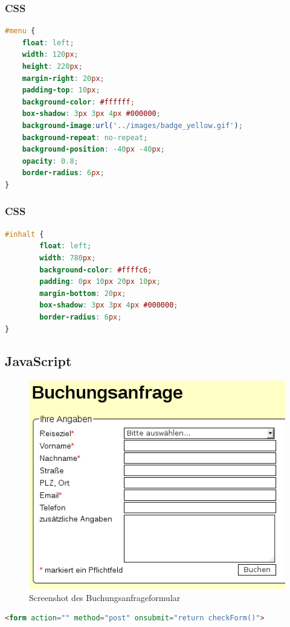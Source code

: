 \documentclass[xcolor=dvipsnames]{beamer}
\begin{document}
\begin{frame}[fragile]
\frametitle{CSS}

\begin{lstlisting}[language=CSS, firstnumber=12]
#menu {
    float: left;
    width: 120px;
    height: 220px;
    margin-right: 20px;
    padding-top: 10px;
    background-color: #ffffff;
    box-shadow: 3px 3px 4px #000000;
    background-image:url('../images/badge_yellow.gif');
    background-repeat: no-repeat;
    background-position: -40px -40px;
    opacity: 0.8;
    border-radius: 6px;
}
\end{lstlisting}
\end{frame}

\begin{frame}[fragile]
\frametitle{CSS}

\begin{lstlisting}[language=CSS, firstnumber=51]
#inhalt {
        float: left;
        width: 780px;
        background-color: #ffffc6;
        padding: 0px 10px 20px 10px;
        margin-bottom: 20px;
        box-shadow: 3px 3px 4px #000000;
        border-radius: 6px;
}

\end{lstlisting}
\end{frame}


\subsection{JavaScript}
\begin{frame}[fragile] %
	\begin{figure}
	\includegraphics[scale=0.5]{screenshot_buchung.png}
	\caption{Screenshot des Buchungsanfrageformular}
	\end{figure}

	\begin{lstlisting}[language=HTML, firstnumber=4]
<form action="" method="post" onsubmit="return checkForm()">
	\end{lstlisting}
	
\end{frame}
\end{document}
